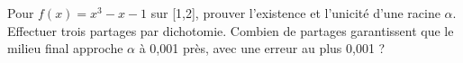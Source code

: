 \documentclass[11pt]{article}
\begin{document}
Pour \(f(x)=x^{3}-x-1\) sur [1,2], prouver l’existence et l’unicité d’une racine \(\alpha \). Effectuer trois partages par dichotomie. Combien de partages garantissent que le milieu final approche \(\alpha \) à 0,001 près, avec une erreur au plus 0,001 ?\par
\vspace{5pt}
\end{document}
